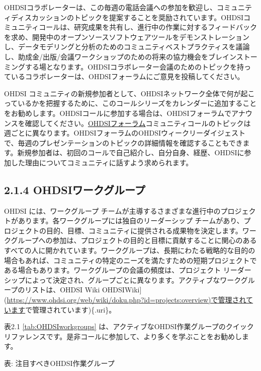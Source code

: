 \documentclass[
  11pt]{book}
\theoremstyle{definition}
\theoremstyle{definition}
\theoremstyle{definition}
\theoremstyle{definition}
\theoremstyle{remark}
\begin{document}
OHDSIコラボレーターは、この毎週の電話会議への参加を歓迎し、コミュニティディスカッションのトピックを提案することを奨励されています。OHDSIコミュニティコールは、研究成果を共有し、進行中の作業に対するフィードバックを求め、開発中のオープンソースソフトウェアツールをデモンストレーションし、データモデリングと分析のためのコミュニティベストプラクティスを議論し、助成金/出版/会議ワークショップのための将来の協力機会をブレインストーミングする場となります。OHDSIコラボレーター会議のためのトピックを持っているコラボレーターは、OHDSIフォーラムにご意見を投稿してください。

OHDSI コミュニティの新規参加者として、OHDSIネットワーク全体で何が起こっているかを把握するために、このコールシリーズをカレンダーに追加することをお勧めします。OHDSIコールに参加する場合は、OHDSIフォーラムでアナウンスを確認してください。\href{https://forums.ohdsi.org/}{OHDSIフォーラム}コミュニティコールのトピックは週ごとに異なります。OHDSIフォーラムのOHDSIウィークリーダイジェストで、毎週のプレゼンテーションのトピックの詳細情報を確認することもできます。新規参加者は、初回のコールで自己紹介し、自分自身、経歴、OHDSIに参加した理由についてコミュニティに話すよう求められます。

\subsection{2.1.4 OHDSIワークグループ}\label{ohdsiux30efux30fcux30afux30b0ux30ebux30fcux30d7}

OHDSI には、ワークグループ チームが主導するさまざまな進行中のプロジェクトがあります。各ワークグループには独自のリーダーシップ チームがあり、プロジェクトの目的、目標、コミュニティに提供される成果物を決定します。ワークグループへの参加は、プロジェクトの目的と目標に貢献することに関心のあるすべての人に開かれています。ワークグループは、長期にわたる戦略的な目的の場合もあれば、コミュニティの特定のニーズを満たすための短期プロジェクトである場合もあります。ワークグループの会議の頻度は、プロジェクト リーダーシップによって決定され、グループごとに異なります。アクティブなワークグループのリストは、OHDSI Wiki OHDSIWiki{]}(\href{https://www.ohdsi.org/web/wiki/doku.php?id=projects:overview}{https://www.ohdsi.org/web/wiki/doku.php?id=projects:overview)で管理されています}で管理されています)\{.uri\}。 

表2.1 \ref{tab:OHDSIworkgroups} は、アクティブなOHDSI作業グループのクイックリファレンスです。是非コールに参加して、より多くを学ぶことをお勧めします。

表: \label{tab:OHDSIworkgroups} 注目すべきOHDSI作業グループ
\end{document}
